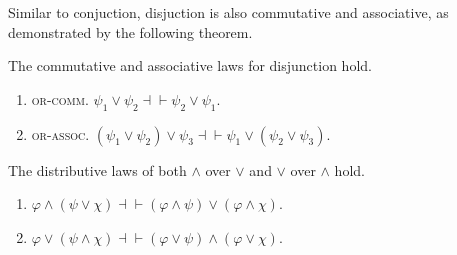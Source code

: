 Similar to conjuction, disjuction is also commutative and associative, as demonstrated by the following theorem. 

\begin{theorem}
    The commutative and associative laws for disjunction hold. 
    \begin{enumerate}[itemindent=0ex, itemsep=0pt, label=\upshape{(\alph*)}]
        \item \textup{\textsc{or-comm}}. $\psi_1\vee\psi_2\dashv\vdash\psi_2\vee\psi_1$.
        \item \textup{\textsc{or-assoc}}. $(\psi_1\vee\psi_2)\vee\psi_3\dashv\vdash\psi_1\vee(\psi_2\vee\psi_3)$.
    \end{enumerate}
\end{theorem}

\begin{theorem}
    The distributive laws of both $\wedge$ over $\vee$ and $\vee$ over $\wedge$ hold.
    \begin{enumerate}[itemindent=0ex, itemsep=0pt, label=\upshape{(\alph*)}]
        \item $\varphi\wedge(\psi\vee\chi)\dashv\vdash(\varphi\wedge\psi)\vee(\varphi\wedge\chi)$.
        \item $\varphi\vee(\psi\wedge\chi)\dashv\vdash(\varphi\vee\psi)\wedge(\varphi\vee\chi)$.
    \end{enumerate}
\end{theorem}

